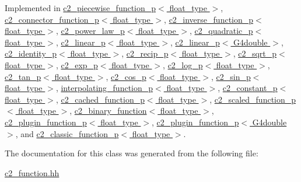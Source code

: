 Implemented in \hyperlink{classc2__piecewise__function__p_a24dda73e84778fa9eb2160195403c45f}{c2\-\_\-piecewise\-\_\-function\-\_\-p$<$ float\-\_\-type $>$}, \hyperlink{classc2__connector__function__p_a0c748860e1ef547a0cce583c01abe175}{c2\-\_\-connector\-\_\-function\-\_\-p$<$ float\-\_\-type $>$}, \hyperlink{classc2__inverse__function__p_a907dbfc4a1ea0530ae76a1ae8704f8ce}{c2\-\_\-inverse\-\_\-function\-\_\-p$<$ float\-\_\-type $>$}, \hyperlink{classc2__power__law__p_a21f0088450f7b7110a001f4960e95fa1}{c2\-\_\-power\-\_\-law\-\_\-p$<$ float\-\_\-type $>$}, \hyperlink{classc2__quadratic__p_ade79e98941853a179b2be14b6cc6daa3}{c2\-\_\-quadratic\-\_\-p$<$ float\-\_\-type $>$}, \hyperlink{classc2__linear__p_a1d6ce127c8e991c4293f530f341ce617}{c2\-\_\-linear\-\_\-p$<$ float\-\_\-type $>$}, \hyperlink{classc2__linear__p_a1d6ce127c8e991c4293f530f341ce617}{c2\-\_\-linear\-\_\-p$<$ G4double $>$}, \hyperlink{classc2__identity__p_a69a30999382af761b9360179dbedbc88}{c2\-\_\-identity\-\_\-p$<$ float\-\_\-type $>$}, \hyperlink{classc2__recip__p_a0f05f680a8074a14c6d2ed5f5e1ebeca}{c2\-\_\-recip\-\_\-p$<$ float\-\_\-type $>$}, \hyperlink{classc2__sqrt__p_aef50454e3f093a7e956c3a994b46ce9d}{c2\-\_\-sqrt\-\_\-p$<$ float\-\_\-type $>$}, \hyperlink{classc2__exp__p_a1c5cb28b65356b2f2290ae11d651f93e}{c2\-\_\-exp\-\_\-p$<$ float\-\_\-type $>$}, \hyperlink{classc2__log__p_acd98067684930659e4a47390385e56b3}{c2\-\_\-log\-\_\-p$<$ float\-\_\-type $>$}, \hyperlink{classc2__tan__p_ac1e6ff8fd74a4d33ce189297fd16bbee}{c2\-\_\-tan\-\_\-p$<$ float\-\_\-type $>$}, \hyperlink{classc2__cos__p_ae4e275f2739d33bfbf1f2efc741535d5}{c2\-\_\-cos\-\_\-p$<$ float\-\_\-type $>$}, \hyperlink{classc2__sin__p_a9710a5d48360f4c6e1568f1ad849dd7b}{c2\-\_\-sin\-\_\-p$<$ float\-\_\-type $>$}, \hyperlink{classinterpolating__function__p_a321e6a9a8e598ebb0ae77ce265742ed7}{interpolating\-\_\-function\-\_\-p$<$ float\-\_\-type $>$}, \hyperlink{classc2__constant__p_a75ec878f6eb48c5ea0187197c645dd66}{c2\-\_\-constant\-\_\-p$<$ float\-\_\-type $>$}, \hyperlink{classc2__cached__function__p_a09f22efcdcf81c1a7b353d10e29b193c}{c2\-\_\-cached\-\_\-function\-\_\-p$<$ float\-\_\-type $>$}, \hyperlink{classc2__scaled__function__p_a29f90a45574f413a18349e220287fb5d}{c2\-\_\-scaled\-\_\-function\-\_\-p$<$ float\-\_\-type $>$}, \hyperlink{classc2__binary__function_a7ab60d022222ce65e99f8708bf2aae0d}{c2\-\_\-binary\-\_\-function$<$ float\-\_\-type $>$}, \hyperlink{classc2__plugin__function__p_a7a5f8926ecec5b73f32ad5f90cefe80e}{c2\-\_\-plugin\-\_\-function\-\_\-p$<$ float\-\_\-type $>$}, \hyperlink{classc2__plugin__function__p_a7a5f8926ecec5b73f32ad5f90cefe80e}{c2\-\_\-plugin\-\_\-function\-\_\-p$<$ G4double $>$}, and \hyperlink{classc2__classic__function__p_abf7fc11b0396fc249eb3300ed39b3cc3}{c2\-\_\-classic\-\_\-function\-\_\-p$<$ float\-\_\-type $>$}.



The documentation for this class was generated from the following file\-:\begin{DoxyCompactItemize}
\item 
\hyperlink{c2__function_8hh}{c2\-\_\-function.\-hh}\end{DoxyCompactItemize}

